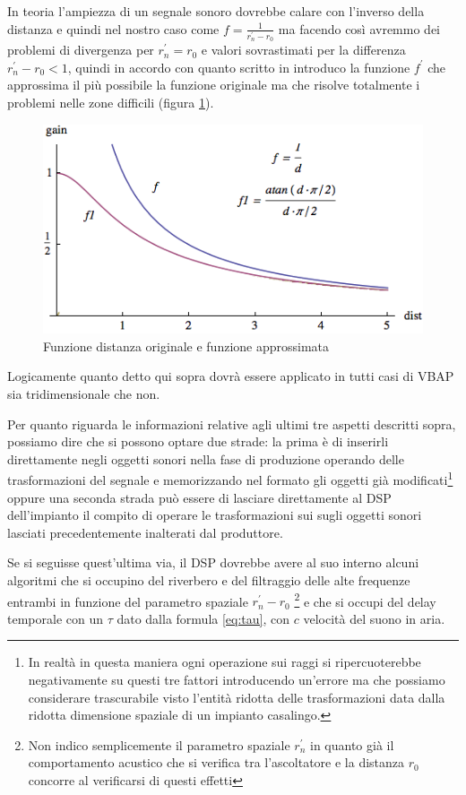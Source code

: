 \documentclass[12pt,a4paper]{report}
\begin{document}
In teoria l'ampiezza di un segnale sonoro dovrebbe calare con l'inverso della distanza e quindi nel nostro caso come $f=\frac{1}{r_n^{\prime}-r_0}$ ma facendo così avremmo dei problemi di divergenza per $r_n^{\prime}=r_0$ e valori sovrastimati per la differenza $r_n^{\prime}-r_0<1$, quindi in accordo con quanto scritto in \cite{distanza} introduco la funzione $f^{\prime}$ che approssima il più possibile la funzione originale ma che risolve totalmente i problemi nelle zone difficili (figura \ref{fig:distance}).

\begin{figure}[htbp]
	\centering
	\includegraphics[scale=0.60]{figures/distance.png}
	\caption {Funzione distanza originale e funzione approssimata}
	\label{fig:distance}
	\end{figure}

Logicamente quanto detto qui sopra dovrà essere applicato in tutti casi di VBAP sia tridimensionale che non.

Per quanto riguarda le informazioni relative agli ultimi tre aspetti descritti sopra, possiamo dire che si possono optare due strade: la prima è di inserirli direttamente negli oggetti sonori nella fase di produzione operando delle trasformazioni del segnale e memorizzando nel formato gli oggetti già modificati\footnote{In realtà in questa maniera ogni operazione sui raggi si ripercuoterebbe negativamente su questi tre fattori introducendo un'errore ma che possiamo considerare trascurabile visto l'entità ridotta delle trasformazioni data dalla ridotta dimensione spaziale di un impianto casalingo.} oppure una seconda strada può essere di lasciare direttamente al DSP dell'impianto il compito di operare le trasformazioni sui sugli oggetti sonori lasciati precedentemente inalterati dal produttore.

Se si seguisse quest'ultima via, il DSP dovrebbe avere al suo interno alcuni algoritmi che si occupino del riverbero e del filtraggio delle alte frequenze entrambi in funzione del parametro spaziale $r_n^{\prime}-r_0$  \footnote{Non indico semplicemente il parametro spaziale $r_n^{\prime}$ in quanto già il comportamento acustico che si verifica tra l'ascoltatore e la distanza $r_0$ concorre al verificarsi di questi effetti} e che si occupi del delay temporale   con un $\tau$ dato dalla formula \ref{eq:tau}, con $c$ velocità del suono in aria.
\end{document}
